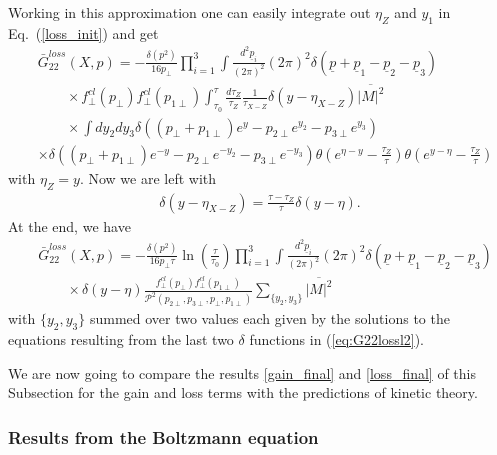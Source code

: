 \documentclass[onecolumn,showpacs,nobibnotes,nofootinbib,12pt,aps,prd,showpacs,notitlepage,nofootinbib,preprintnumbers,amsmath,amssymb]{article}
\def\eq#1{{Eq.~(\ref{#1})}}
\begin{document}
Working in this approximation one can easily integrate out $\eta_Z$
and $y_1$ in \eq{loss_init} and get
\begin{align}
  &\bar G_{22}^{loss}(X,p)=-\frac{\delta(p^2)}{16p_\perp}\prod\limits_{i=1}^3\int\frac{d^2\underline{p}_i}{(2\pi)^2}(2\pi)^2\delta(\underline{p}+\underline{p}_1-\underline{p}_2-\underline{p}_3)\nonumber\\
  &\qquad\times f_\perp^{cl}(p_\perp)f_\perp^{cl}(p_{1\perp}) \int_{\tau_0}^\tau \frac{d\tau_Z}{\tau_Z} \frac{1}{\tau_{X-Z}}\delta(y-\eta_{X-Z})\overline{|M|^2}\nonumber\\
  &\qquad\times\int d y_2 d y_3\delta((p_\perp+p_{1\perp}) e^{y}-p_{2\perp}e^{y_2}-p_{3\perp}e^{y_3})\nonumber\\
  &\times\delta((p_\perp+p_{1\perp})
  e^{-y}-p_{2\perp}e^{-y_2}-p_{3\perp}e^{-y_3})\theta\left(e^{\eta-y}-\frac{\tau_Z}{\tau}\right)\theta\left(e^{y-\eta}-\frac{\tau_Z}{\tau}\right)\label{eq:G22lossl2}
\end{align}
with $\eta_Z=y$. Now we are left with
\begin{align}
  \delta(y-\eta_{X-Z})=\frac{\tau-\tau_Z}{\tau}\delta(y-\eta).
\end{align}
At the end, we have
\begin{align}
  &\bar G_{22}^{loss}(X,p)=-\frac{\delta(p^2)}{16p_\perp \tau}\ln\left(\frac{\tau}{\tau_0}\right)\prod\limits_{i=1}^3\int\frac{d^2\underline{p}_i}{(2\pi)^2}(2\pi)^2\delta(\underline{p}+\underline{p}_1-\underline{p}_2-\underline{p}_3)\nonumber\\
  &\qquad\times
  \delta(y-\eta)\frac{f_\perp^{cl}(p_\perp)f_\perp^{cl}(p_{1\perp})}{\mathcal{P}^2(p_{2\perp},
    p_{3\perp},p_\perp,p_{1\perp})}\sum\limits_{\{y_2,y_3\}}\overline{|M|^2} \label{loss_final}
\end{align}
with $\{y_2,y_3\}$ summed over two values each given by the solutions
to the equations resulting from the last two $\delta$ functions in
(\ref{eq:G22lossl2}). 

We are now going to compare the results \eqref{gain_final} and
\eqref{loss_final} of this Subsection for the gain and loss terms with
the predictions of kinetic theory.


\subsubsection{Results from the Boltzmann equation}
\end{document}
